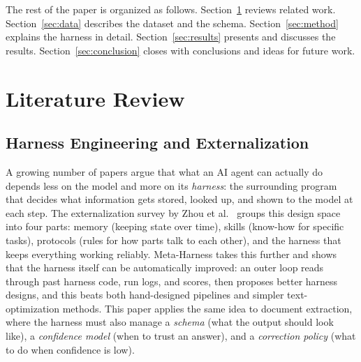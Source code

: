 \documentclass[conference]{IEEEtran}
\begin{document}
The rest of the paper is organized as follows. Section~\ref{sec:lit} reviews related work. Section~\ref{sec:data} describes the dataset and the schema. Section~\ref{sec:method} explains the harness in detail. Section~\ref{sec:results} presents and discusses the results. Section~\ref{sec:conclusion} closes with conclusions and ideas for future work.

\section{Literature Review}
\label{sec:lit}

\subsection{Harness Engineering and Externalization}
A growing number of papers argue that what an AI agent can actually do depends less on the model and more on its \emph{harness}: the surrounding program that decides what information gets stored, looked up, and shown to the model at each step. The externalization survey by Zhou et al.\ \cite{b1} groups this design space into four parts: memory (keeping state over time), skills (know-how for specific tasks), protocols (rules for how parts talk to each other), and the harness that keeps everything working reliably. Meta-Harness \cite{b2} takes this further and shows that the harness itself can be automatically improved: an outer loop reads through past harness code, run logs, and scores, then proposes better harness designs, and this beats both hand-designed pipelines and simpler text-optimization methods. This paper applies the same idea to document extraction, where the harness must also manage a \emph{schema} (what the output should look like), a \emph{confidence model} (when to trust an answer), and a \emph{correction policy} (what to do when confidence is low).
\end{document}
